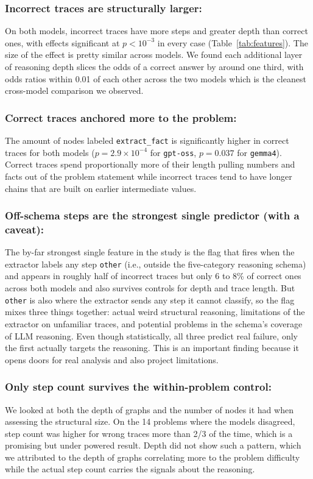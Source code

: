 \documentclass[letterpaper]{article}
\begin{document}
\subsubsection*{Incorrect traces are structurally larger:}
On both models, incorrect traces have more steps and greater depth
than correct ones, with effects significant at $p < 10^{-3}$ in
every case (Table~\ref{tab:features}). The size of the effect is pretty similar across models. We found each
additional layer of reasoning depth slices the odds of a correct
answer by around one third, with odds ratios within 0.01 of each
other across the two models which is the cleanest cross-model
comparison we observed.

\subsubsection*{Correct traces anchored more to the problem:}
The amount of nodes labeled \texttt{extract\_fact} is significantly
higher in correct traces for both models ($p=2.9\!\times\!10^{-4}$ for
\texttt{gpt-oss}, $p=0.037$ for \texttt{gemma4}). Correct traces spend
proportionally more of their length pulling numbers and facts out of the
problem statement while incorrect traces tend to have longer chains that are built on earlier intermediate values.

\subsubsection*{Off-schema steps are the strongest single predictor (with a caveat):}

The by-far strongest single feature in the study is the flag that fires when the extractor labels any step \texttt{other}
(i.e., outside the five-category reasoning schema) and appears in roughly
half of incorrect traces but only 6 to 8\% of correct ones across both
models and also survives controls for depth and trace length.
But \texttt{other} is also where the extractor sends any step it
cannot classify, so the flag mixes three things together: actual
weird structural reasoning, limitations of the extractor on unfamiliar traces, and potential problems in the schema's coverage of LLM reasoning. Even though statistically, all three predict real failure, only the first actually targets the reasoning. This is an important finding because it opens doors for real analysis and also project limitations.

\subsubsection*{Only step count survives the within-problem control:}
We looked at both the depth of graphs and the number of nodes it had when assessing the structural size. On the 14 problems where the models disagreed, step count was higher for wrong traces more than 2/3 of the time, which is a promising but under powered result. Depth did not show such a pattern, which we attributed to the depth of graphs correlating more to the problem difficulty while the actual step count carries the signals about the reasoning. 
\end{document}
